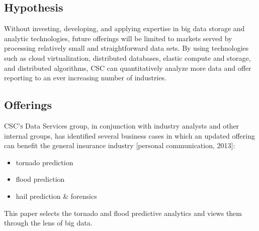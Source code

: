 \subsection{Hypothesis}
Without investing, developing, and applying expertise in big data  storage and analytic technologies, future \climatedge offerings will be limited to markets served by processing relatively small and straightforward data sets. By using technologies such as cloud  virtualization, distributed databases, elastic compute and storage, and distributed algorithms, \textsc{CSC} can quantitatively analyze more data and offer \climatedge reporting to an ever increasing number of industries.
\subsection{Offerings}
\textsc{CSC's} Data Services group, in conjunction with industry analysts and other internal groups,  has identified several business cases  in which an updated \climatedge offering can benefit the general insurance industry [personal communication, 2013]:
\begin{itemize}
    \item tornado prediction
    \item flood prediction
    \item hail prediction \& forensics
\end{itemize}
 This paper selects the tornado and flood predictive analytics and views them through the lens of big data.
